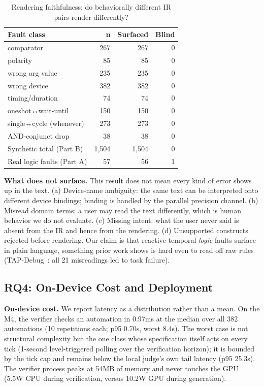 \documentclass[sigconf,nonacm,anonymous,review]{acmart}
\begin{document}
\begin{table}[t]
\centering
\caption{Rendering faithfulness: do behaviorally different IR pairs render differently?}
\label{tab:faithful}
\small
\begin{tabular}{lrrr}
\toprule
Fault class & n & Surfaced & Blind \\
\midrule
comparator                & 267 & 267 & 0 \\
polarity                  & 85  & 85  & 0 \\
wrong arg value           & 235 & 235 & 0 \\
wrong device              & 382 & 382 & 0 \\
timing/duration           & 74  & 74  & 0 \\
oneshot↔wait-until        & 150 & 150 & 0 \\
single↔cycle (whenever)   & 273 & 273 & 0 \\
AND-conjunct drop         & 38  & 38  & 0 \\
\midrule
Synthetic total (Part B)   & 1,504 & 1,504 & 0 \\
Real logic faults (Part A) & 57  & 56  & 1 \\
\bottomrule
\end{tabular}
\end{table}

\textbf{What does not surface.} This result does not mean every kind of error shows up in the text. (a) Device-name ambiguity: the same text can be interpreted onto different device bindings; binding is handled by the parallel precision channel. (b) Misread domain terms: a user may read the text differently, which is human behavior we do not evaluate. (c) Missing intent: what the user never said is absent from the IR and hence from the rendering. (d) Unsupported constructs rejected before rendering. Our claim is that reactive-temporal \emph{logic} faults surface in plain language, something prior work shows is hard even to read off raw rules (TAP-Debug~\cite{tapdebug}: all 21 misreadings led to task failure).

\subsection{RQ4: On-Device Cost and Deployment}

\textbf{On-device cost.} We report latency as a distribution rather than a mean. On the M4, the verifier checks an automation in 0.97ms at the median over all 382 automations (10 repetitions each; p95 0.70s, worst 8.4s). The worst case is not structural complexity but the one class whose specification itself acts on every tick (1-second level-triggered polling over the verification horizon); it is bounded by the tick cap and remains below the local judge's own tail latency (p95 25.3s). The verifier process peaks at 54MB of memory and never touches the GPU (5.5W CPU during verification, versus 10.2W GPU during generation).
\end{document}
